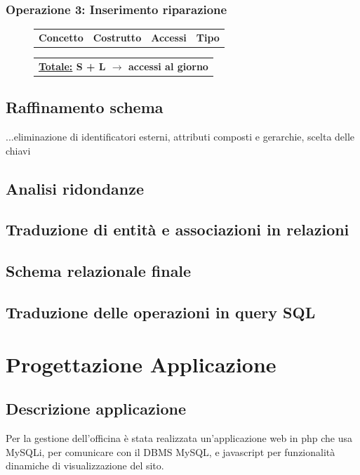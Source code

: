 \documentclass[a4paper,12pt]{report}
\begin{document}
\subsection*{Operazione 3: Inserimento riparazione}
\begin{figure}[ht]
	\centering
	\begin{tabular}{L{3cm}C{2.5cm}C{4.5cm}C{2.5cm}}
		\rule[-2mm]{0mm}{0.6cm}{}
		\textbf{Concetto} & \textbf{Costrutto} &\textbf{Accessi} & \textbf{Tipo} \\

	\end{tabular}
	
	\begin{tabular}{C{13.9cm}}
		\rule[-3mm]{0mm}{0.85cm}{}	
		 \textbf{\underline{Totale:} S + L $\to$  accessi al giorno}
	\end{tabular}
\end{figure}

\section{Raffinamento schema}
...eliminazione di identificatori esterni, attributi composti e gerarchie, scelta delle chiavi

\section{Analisi ridondanze}

\section{Traduzione di entità e associazioni in relazioni}

\section{Schema relazionale finale}

\section{Traduzione delle operazioni in query SQL}

\chapter{Progettazione Applicazione}

\section{Descrizione applicazione}
Per la gestione dell'officina è stata realizzata un'applicazione web in php che usa MySQLi, per  
%
comunicare con il DBMS MySQL, e javascript per funzionalità dinamiche di visualizzazione del sito.
\end{document}
